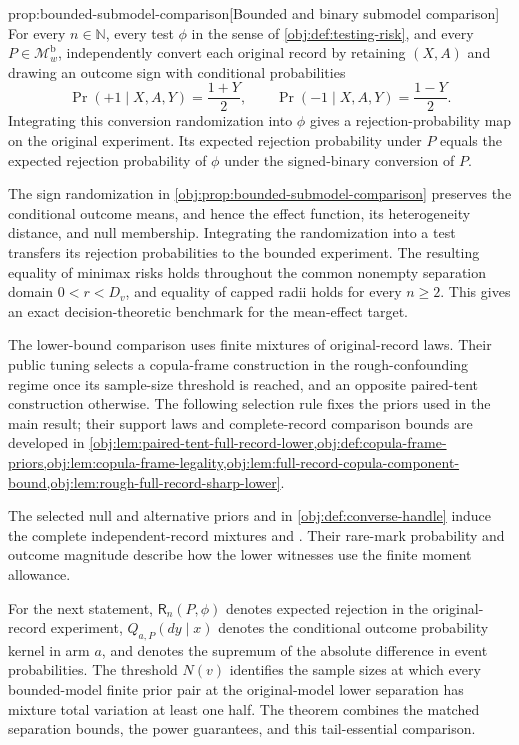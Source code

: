 \begin{propositionv}{prop:bounded-submodel-comparison}[Bounded and binary submodel comparison]
For every \(n\in\mathbb N\), every test \(\phi\) in the sense of \cref{obj:def:testing-risk}, and every \(P\in\mathcal M^{\mathrm b}_w\), independently convert each original record by retaining \((X,A)\) and drawing an outcome sign with conditional probabilities
\[
\Pr(+1\mid X,A,Y)=\frac{1+Y}{2},
\qquad
\Pr(-1\mid X,A,Y)=\frac{1-Y}{2}.
\]
Integrating this conversion randomization into \(\phi\) gives a rejection-probability map on the original experiment. Its expected rejection probability under \(P\) equals the expected rejection probability of \(\phi\) under the signed-binary conversion of \(P\).
\end{propositionv}

The sign randomization in \cref{obj:prop:bounded-submodel-comparison} preserves the conditional outcome means, and hence the effect function, its heterogeneity distance, and null membership. Integrating the randomization into a test transfers its rejection probabilities to the bounded experiment. The resulting equality of minimax risks holds throughout the common nonempty separation domain \(0<r<D_v\), and equality of capped radii holds for every \(n\ge2\). This gives an exact decision-theoretic benchmark for the mean-effect target.

The lower-bound comparison uses finite mixtures of original-record laws. Their public tuning selects a copula-frame construction in the rough-confounding regime once its sample-size threshold is reached, and an opposite paired-tent construction otherwise. The following selection rule fixes the priors used in the main result; their support laws and complete-record comparison bounds are developed in \cref{obj:lem:paired-tent-full-record-lower,obj:def:copula-frame-priors,obj:lem:copula-frame-legality,obj:lem:full-record-copula-component-bound,obj:lem:rough-full-record-sharp-lower}.



The selected null and alternative priors  and  in \cref{obj:def:converse-handle} induce the complete independent-record mixtures  and . Their rare-mark probability  and outcome magnitude  describe how the lower witnesses use the finite moment allowance.

For the next statement, \(\mathsf R_n(P,\phi)\) denotes expected rejection in the original-record experiment, \(Q_{a,P}(dy\mid x)\) denotes the conditional outcome probability kernel in arm \(a\), and  denotes the supremum of the absolute difference in event probabilities. The threshold \(N(v)\) identifies the sample sizes at which every bounded-model finite prior pair at the original-model lower separation has mixture total variation at least one half. The theorem combines the matched separation bounds, the power guarantees, and this tail-essential comparison.



